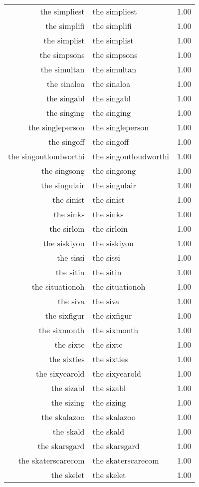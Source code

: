 \begin{table}[ht]
\begin{tabular}{rlr}
  the simpliest & the simpliest & 1.00 \\ 
  the simplifi & the simplifi & 1.00 \\ 
  the simplist & the simplist & 1.00 \\ 
  the simpsons & the simpsons & 1.00 \\ 
  the simultan & the simultan & 1.00 \\ 
  the sinaloa & the sinaloa & 1.00 \\ 
  the singabl & the singabl & 1.00 \\ 
  the singing & the singing & 1.00 \\ 
  the singleperson & the singleperson & 1.00 \\ 
  the singoff & the singoff & 1.00 \\ 
  the singoutloudworthi & the singoutloudworthi & 1.00 \\ 
  the singsong & the singsong & 1.00 \\ 
  the singulair & the singulair & 1.00 \\ 
  the sinist & the sinist & 1.00 \\ 
  the sinks & the sinks & 1.00 \\ 
  the sirloin & the sirloin & 1.00 \\ 
  the siskiyou & the siskiyou & 1.00 \\ 
  the sissi & the sissi & 1.00 \\ 
  the sitin & the sitin & 1.00 \\ 
  the situationoh & the situationoh & 1.00 \\ 
  the siva & the siva & 1.00 \\ 
  the sixfigur & the sixfigur & 1.00 \\ 
  the sixmonth & the sixmonth & 1.00 \\ 
  the sixte & the sixte & 1.00 \\ 
  the sixties & the sixties & 1.00 \\ 
  the sixyearold & the sixyearold & 1.00 \\ 
  the sizabl & the sizabl & 1.00 \\ 
  the sizing & the sizing & 1.00 \\ 
  the skalazoo & the skalazoo & 1.00 \\ 
  the skald & the skald & 1.00 \\ 
  the skarsgard & the skarsgard & 1.00 \\ 
  the skaterscarecom & the skaterscarecom & 1.00 \\ 
  the skelet & the skelet & 1.00 \\ 

\end{tabular}
\end{table}
